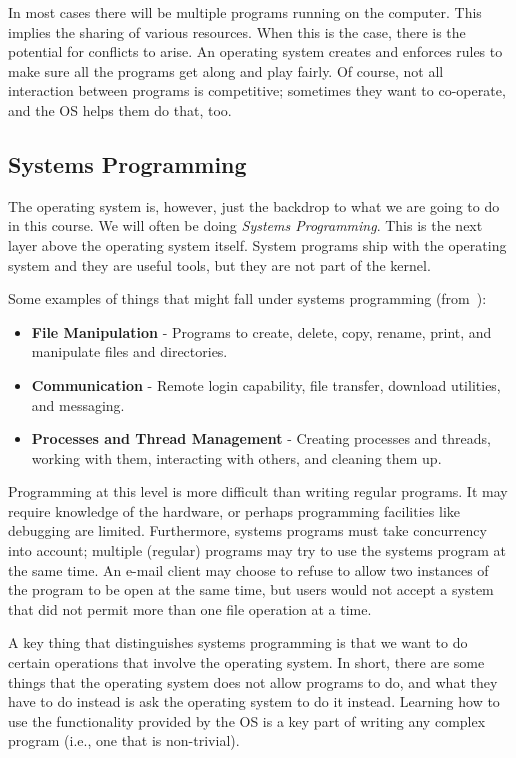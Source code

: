 In most cases there will be multiple programs running on the computer. This implies the sharing of various resources. When this is the case, there is the potential for conflicts to arise. An operating system creates and enforces rules to make sure all the programs get along and play fairly. Of course, not all interaction between programs is competitive; sometimes they want to co-operate, and the OS helps them do that, too.


\subsection*{Systems Programming}
The operating system is, however, just the backdrop to what we are going to do in this course. We will often be doing \textit{Systems Programming}. This is the next layer above the operating system itself. System programs ship with the operating system and they are useful tools, but they are not part of the kernel. 

Some examples of things that might fall under systems programming (from~\cite{osc}):

\begin{itemize}
	\item \textbf{File Manipulation} - Programs to create, delete, copy, rename, print, and manipulate files and directories.
	\item \textbf{Communication} - Remote login capability, file transfer, download utilities, and messaging.
	\item \textbf{Processes and Thread Management} - Creating processes and threads, working with them, interacting with others, and cleaning them up.
\end{itemize}

Programming at this level is more difficult than writing regular programs. It may require knowledge of the hardware, or perhaps programming facilities like debugging are limited. Furthermore, systems programs must take concurrency into account; multiple (regular) programs may try to use the systems program at the same time. An e-mail client may choose to refuse to allow two instances of the program to be open at the same time, but users would not accept a system that did not permit more than one file operation at a time. 

A key thing that distinguishes systems programming is that we want to do certain operations that involve the operating system. In short, there are some things that the operating system does not allow programs to do, and what they have to do instead is ask the operating system to do it instead. Learning how to use the functionality provided by the OS is a key part of writing any complex program (i.e., one that is non-trivial).

